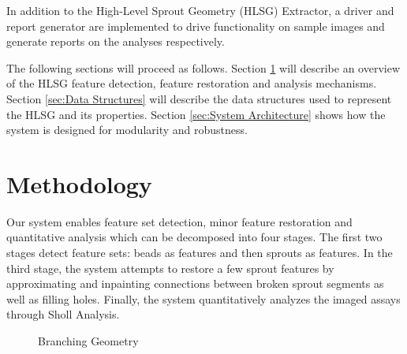\documentclass{sig-alternate}
\begin{document}
	In addition to the High-Level Sprout Geometry (HLSG) Extractor, a driver
	and report generator are implemented to drive functionality on sample
	images and generate reports on the analyses respectively.

	The following sections will proceed as follows. Section
	\ref{sec:Methodology} will describe an overview of the HLSG feature
	detection, feature restoration and analysis mechanisms. Section
	\ref{sec:Data Structures} will describe the data structures used to
	represent the HLSG and its properties. Section \ref{sec:System
	Architecture} shows how the system is designed for modularity and
	robustness.

\section{Methodology} %




\label{sec:Methodology}
	Our system enables feature set detection, minor feature restoration and
	quantitative analysis which can be decomposed into four stages. The
	first two stages detect feature sets: beads as features and then
	sprouts as features. In the third stage, the system attempts to restore
	a few sprout features by approximating and inpainting connections between
	broken sprout segments as well as filling holes. Finally, the system
	quantitatively analyzes the imaged assays through Sholl Analysis.

	\begin{figure}[htp!]
		\centering
		
		\caption{Branching Geometry}
		\label{fig:beadex}
	\end{figure}
\end{document}
